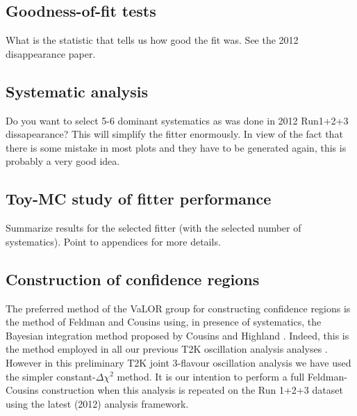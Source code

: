 
\subsection{Goodness-of-fit tests}

{\color{red} What is the statistic that tells us how good the fit was. See the 2012 disappearance paper.}


\subsection{Systematic analysis}

{\color{red} Do you want to select 5-6 dominant systematics as was done in 2012 Run1+2+3 dissapearance?
This will simplify the fitter enormously. In view of the fact that there is some mistake in most plots and they have to be 
generated again, this is probably a very good idea. }



\subsection{Toy-MC study of fitter performance}

{\color{red} Summarize results for the selected fitter (with the selected number of systematics). Point to appendices
for more details.}


\subsection{Construction of confidence regions}

The preferred method of the VaLOR group for constructing confidence regions is the 
method of Feldman and Cousins \cite{FeldmanCousins} using, in presence of systematics, the Bayesian integration method
proposed by Cousins and Highland \cite{CousinsHighland}.
Indeed, this is the method employed in all our previous T2K oscillation analysis analyses 
\cite{OurRun1DisappAnalysis2F, OurRun1and2Analysis2F, OurRun1and2Analysis3F, OurRun1and2and3Analysis3F}.
However in this preliminary T2K joint 3-flavour oscillation analysis
we have used the simpler constant-$\Delta\chi^2$ method.
It is our intention to perform a full Feldman-Cousins construction when this analysis is repeated
on the Run 1+2+3 dataset using the latest (2012) analysis framework.

